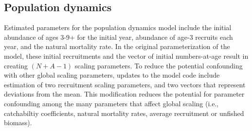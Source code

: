 \documentclass[12pt,letterpaper]{article}
\begin{document}
  \subsection{Population dynamics} %
  \label{sub:population_dynamics}
  Estimated parameters for the population dynamics model include the initial abundance of ages 3-9+ for the initial year, abundance of age-3 recruits each year, and the natural mortality rate. In the original parameterization of the model, these initial recruitments and the vector of initial numbers-at-age result in creating $(N + A-1)$ scaling parameters.  To reduce the potential confounding with other global scaling parameters, updates to the model code include estimation of two recruitment scaling parameters, and two vectors that represent deviations from the mean. This modification reduces the potential for parameter confounding among the many parameters that affect global scaling (i.e., catchabiltiy coefficients, natural mortality rates, average recruitment or unfished biomass).

    
  

  
\end{document}
